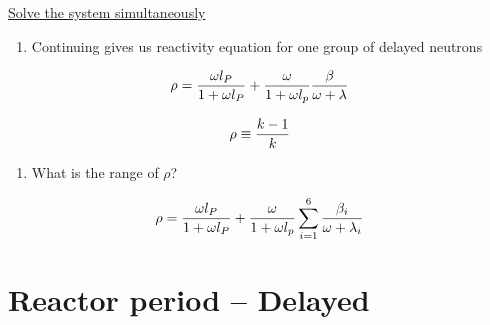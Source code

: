 \documentclass[aspectratio=1610,pdftex,dvipsnames,compress,xcolor={dvipsnames}]{beamer}
\begin{document}
\begin{frame}{\href{https://uidaho.pressbooks.pub/nuclearengineering/chapter/math-skills/}{Solve the system simultaneously}}
    \begin{enumerate}[series=outerlist,topsep=0pt,itemsep=21pt,leftmargin=*,label=(\arabic*)]
        \item[]Continuing gives us reactivity equation for one group of delayed neutrons
    \end{enumerate}

    \vspace*{\fill}

    \begin{equation}
        \LARGE
        \rho = \frac{\omega l_P}{1+\omega l_P} + \frac{\omega}{1+\omega l_p} \frac{\beta}{\omega+\lambda}
    \end{equation}

    \begin{equation}
        \LARGE
        \rho \equiv \frac{k-1}{k}
    \end{equation}

    \vspace*{\fill}

    \begin{enumerate}[series=outerlist,topsep=0pt,itemsep=21pt,leftmargin=*,label=(\arabic*)]
        \item[]What is the range of $\rho$?
    \end{enumerate}

    \vspace*{\fill}

    \begin{equation}
        \LARGE
        \rho = \frac{\omega l_P}{1 + \omega l_P} + \frac{\omega}{1 + \omega l_p} \sum_{i=1}^6 {\frac{\beta_i}{\omega + \lambda_i}}
    \end{equation}
\end{frame}


\section{Reactor period -- Delayed}
\end{document}

